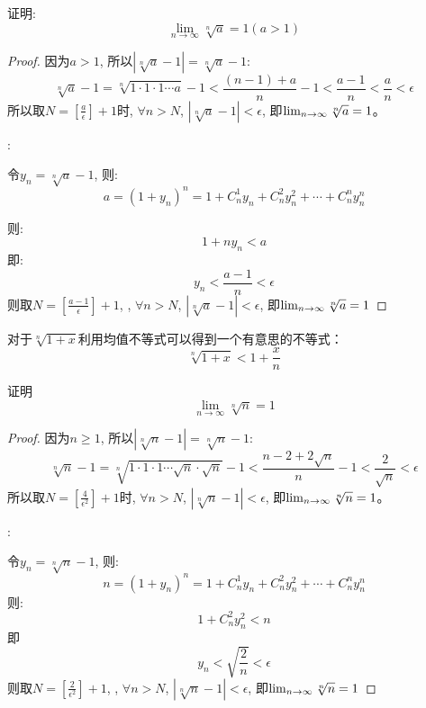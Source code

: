 \begin{example}
    证明:
    \[ \lim_{n \to \infty } \sqrt[n]{a}= 1 (a > 1)\]
\end{example}
\begin{proof}
    因为$a > 1$, 所以$\left| \sqrt[n]{a} - 1 \right| =\sqrt[n]{a} - 1$:
    \begin{equation*}
        \sqrt[n]{a} - 1 = \sqrt[n]{1\cdot 1\cdot 1\cdots a} - 1 < \frac{(n - 1) + a}{n} - 1 < \frac{a - 1}{n} < \frac{a}{n} < \epsilon 
    \end{equation*}
    所以取$N = \left[ \frac{a}{\epsilon} \right] + 1$时, $\forall n > N$, $\left| \sqrt[n]{a} - 1\right| < \epsilon$, 即$\lim_{n \to \infty } \sqrt[n]{a} = 1$。

    :

    令$y_n = \sqrt[n]{a} - 1$, 则:
    \begin{equation*}
        a = (1 + y_n)^n = 1 + C_n^1 y_n + C_n^2 y_n^2 + \cdots + C_n^n y_n^n         
    \end{equation*}

    则:
    \[ 1 + ny_n < a \]
    即:
    \[ y_n < \frac{a - 1}{n} < \epsilon \]
    则取$N = \left[ \frac{a - 1}{\epsilon} \right] + 1$, , $\forall n > N$, $\left| \sqrt[n]{a} - 1\right| < \epsilon$, 即$\lim_{n \to \infty } \sqrt[n]{a} = 1$
\end{proof}
\begin{remark}
    对于$\sqrt[n]{1+x}$利用均值不等式可以得到一个有意思的不等式：
    \begin{equation*}
        \sqrt[n]{1+x} < 1 + \frac{x}{n}
    \end{equation*}
\end{remark}
\begin{example}
    证明
    \[ \lim_{n \to \infty } \sqrt[n]{n}= 1 \]
\end{example}
\begin{proof}
    因为$n \ge 1$, 所以$\left| \sqrt[n]{n} - 1 \right| = \sqrt[n]{n} - 1$:
    \[ \sqrt[n]{n} -1 = \sqrt[n]{1\cdot 1\cdot 1\cdots \sqrt{n} \cdot \sqrt{n} } -1 < \frac{n-2+2\sqrt{n}}{n} - 1 < \frac{2}{\sqrt{n}} < \epsilon \]
    所以取$N = \left[ \frac{4}{\epsilon^2}\right] + 1$时, $\forall n > N$, $\left| \sqrt[n]{n} - 1\right| < \epsilon$, 即$\lim_{n \to \infty } \sqrt[n]{n} = 1$。

    :

    令$y_n = \sqrt[n]{n} - 1$, 则:
    \begin{equation*}
        n = (1 + y_n)^n = 1 + C_n^1 y_n + C_n^2 y_n^2 + \cdots + C_n^n y_n^n
    \end{equation*}
    则:
    \[ 1 + C_n^2 y_n^2 < n \]
    即
    \[ y_n < \sqrt{\frac{2}{n}} < \epsilon \]
    则取$N = \left[ \frac{2}{\epsilon^2} \right] + 1$, , $\forall n > N$, $\left| \sqrt[n]{n} - 1\right| < \epsilon$, 即$\lim_{n \to \infty } \sqrt[n]{n} = 1$
\end{proof}

